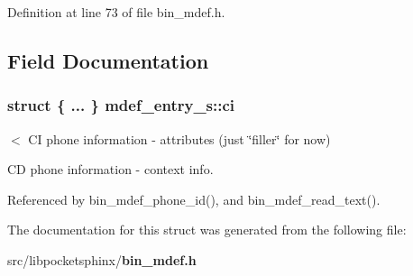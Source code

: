 Definition at line 73 of file bin\+\_\+mdef.\+h.



\subsection{Field Documentation}
\subsubsection[{ci}]{\setlength{\rightskip}{0pt plus 5cm}struct \{ ... \}   mdef\+\_\+entry\+\_\+s\+::ci}\label{structmdef__entry__s_a24e5db7af5e705b310e82154055043ec}


$<$ C\+I phone information -\/ attributes (just \char`\"{}filler\char`\"{} for now) 

C\+D phone information -\/ context info. 

Referenced by bin\+\_\+mdef\+\_\+phone\+\_\+id(), and bin\+\_\+mdef\+\_\+read\+\_\+text().



The documentation for this struct was generated from the following file\+:\begin{DoxyCompactItemize}
\item 
src/libpocketsphinx/{\bf bin\+\_\+mdef.\+h}\end{DoxyCompactItemize}
